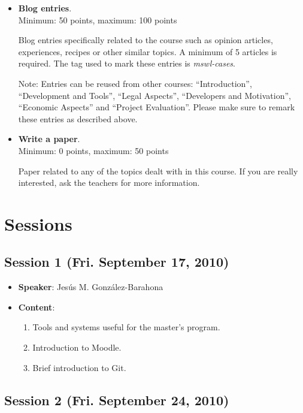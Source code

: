 \documentclass[a4paper]{article}
\begin{document}
\begin{itemize}

\item \textbf{Blog entries}. \\
  Minimum: 50 points, maximum: 100 points

  Blog entries specifically related to the course such as opinion articles, experiences, 
recipes or other similar topics. A minimum of 5 articles is required. The tag used to mark
these entries is \textit{mswl-cases}.

 Note: Entries can be reused from other courses: ``Introduction'', ``Development and Tools'',
``Legal Aspects'', ``Developers and Motivation'', ``Economic Aspects'' and ``Project Evaluation''. 
Please make sure to remark these entries as described above.

\item \textbf{Write a paper}. \\
  Minimum: 0 points, maximum: 50 points

  Paper related to any of the topics dealt with in this course. If you are really interested, ask the teachers for more information.

\end{itemize}


\section{Sessions}

\subsection{Session 1 (Fri. September 17, 2010)}

\begin{itemize}
 \item \textbf{Speaker}: Jesús M. González-Barahona

 \item \textbf{Content}:

  \begin{enumerate}
   \item Tools and systems useful for the master's program.
   \item Introduction to Moodle.
   \item Brief introduction to Git.
  \end{enumerate}

\end{itemize}

\subsection{Session 2 (Fri. September 24, 2010)}
\end{document}
